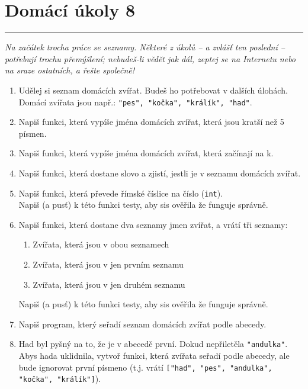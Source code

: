 \documentclass[a4paper,10pt]{article}
\newcommand\plsetno{8}
\newcommand\startsection[1]{
     \vspace{0.2ex}
    \hrule
    {\fontspec{Oxygen} \tiny
     \vspace{-1ex}
     \emph{#1}
     \vspace{-1.5em}
    }
}
\begin{document}
\section*{Domácí úkoly \plsetno}

\startsection{Na začátek trocha práce se seznamy.
    Některé z úkolů – a zvlášť ten poslední – potřebují trochu přemýšlení;
    nebudeš-li vědět jak dál, zeptej se na Internetu nebo na sraze ostatních,
    a řešte společně!}

\begin{enumerate}

\item Udělej si seznam domácích zvířat. Budeš ho potřebovat v dalších úlohách.
    \\Domácí zvířata jsou např.: \verb+"pes", "kočka", "králík", "had"+.


\item Napiš funkci, která vypíše jména domácích zvířat, která jsou kratší než 5 písmen.

\item Napiš funkci, která vypíše jména domácích zvířat, která začínají na k.

\item Napiš funkci, která dostane slovo a zjistí,
    jestli je v seznamu domácích zvířat.

\item Napiš funkci, která převede římské číslice na číslo (\verb+int+).
    \\Napiš (a pusť) k této funkci testy, aby sis ověřila že funguje správně.

\item Napiš funkci, která dostane dva seznamy jmen zvířat, a vrátí tři seznamy:
    \begin{enumerate}
        \item Zvířata, která jsou v obou seznamech
        \item Zvířata, která jsou v jen prvním seznamu
        \item Zvířata, která jsou v jen druhém seznamu
    \end{enumerate}
    Napiš (a pusť) k této funkci testy, aby sis ověřila že funguje správně.

\item Napiš program, který seřadí seznam domácích zvířat podle abecedy.

\item Had byl pyšný na to, že je v abecedě první.
    Dokud nepřiletěla \verb+"andulka"+.
    \\Abys hada uklidnila, vytvoř funkci, která zvířata seřadí podle abecedy,
    ale bude ignorovat první písmeno (t.j. vrátí
        \texttt{["h{\color{plpink}ad}",
                 "p{\color{plpink}es}",
                 "a{\color{plpink}ndulka}",
                 "k{\color{plpink}očka}",
                 "k{\color{plpink}rálík}"]}).


\end{enumerate}
\end{document}
